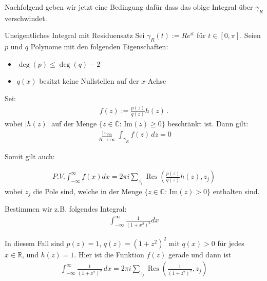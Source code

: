 \documentclass[a4paper,10pt]{article}
\def\Im{\text{Im}}
\begin{document}
Nachfolgend geben wir jetzt eine Bedingung dafür dass das obige Integral über $\gamma_R$ verschwindet.

\begin{subbox}{Uneigentliches Integral mit Residuensatz}
  Sei \(\gamma_R(t):=Re^{ i t}\) für \(t\in[0,\pi]\). Seien \(p\) und \(q\) Polynome mit den folgenden Eigenschaften:
  \begin{itemize}
    \item \(\deg(p)\leq \deg(q)-2\)
    \item \(q(x)\) besitzt keine Nullstellen auf der \(x\)-Achse
  \end{itemize}


Sei: \begin{align*} f(z) := \frac{p(z)}{q(z)}h(z)\,. \end{align*} wobei \(|h(z)|\) auf der Menge \(\{z\in\mathbb{C}:\,\Im(z)\geq0\}\) beschränkt ist. Dann gilt: \begin{align*} \lim_{R\to \infty} \int_{\gamma_R} f(z)\,dz = 0 \end{align*}

Somit gilt auch:

\begin{align*} P.V.\int_{-\infty}^\infty f(x) dx = 2 \pi i \sum_{z_j}\operatorname{Res} \left( \frac{p(z)}{q(z)}h(z),z_j \right) \end{align*} wobei \(z_j\) die Pole sind, welche in der Menge \(\{z\in\mathbb{C}:\,\Im(z)>0\}\) enthalten sind.

\end{subbox}

Bestimmen wir z.B. folgendes Integral: \begin{align*} \int_{-\infty}^{\infty} \frac{1}{(1+x^2)^2}dx\end{align*}

In diesem Fall sind \(p(z)=1\), \(q(z) = (1+z^2)^2\) mit \(q(x) > 0\) für jedes \(x\in\mathbb{R}\), und \(h(z)=1\). Hier ist die Funktion \(f(z)\) gerade und dann ist \begin{align*} \int_{-\infty}^\infty \frac{1}{(1+x^2)^2}\,dx =2 \pi i \sum_{z_j}\operatorname{Res} \left(\frac{1}{(1+z^2)^2},z_j \right) \end{align*}
\end{document}
